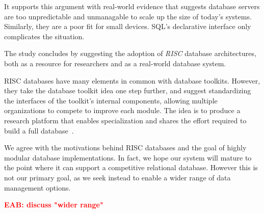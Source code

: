 \documentclass[letterpaper,twocolumn,10pt]{article}
\newcommand{\eab}[1]{\textcolor{red}{\bf EAB: #1}}
\begin{document}
It supports this argument with real-world evidence that suggests
database servers are too unpredictable and unmanagable to
scale up the size of today's systems.  Similarly, they are a poor fit
for small devices.  SQL's declarative interface only complicates the
situation.


The study concludes 
by suggesting the adoption of {\em RISC} database architectures, both as a resource for researchers and as a 
real-world database system.

RISC databases have many elements in common with
database toolkits.  However, they take the database toolkit idea one
step further, and suggest standardizing the interfaces of the
toolkit's internal components, allowing multiple organizations to
compete to improve each module.  The idea is to produce a research
platform that enables specialization and shares the effort required to build a full database~\cite{riscDB}.

We agree with the motivations behind RISC databases and the goal
of highly modular database implementations.  In fact, we  hope
 our system will mature to the point where it can support 
a competitive relational database.  However this is
not our primary goal, as we seek instead to enable a wider range of data management options.

\eab{discuss "wider range"}



\end{document}
